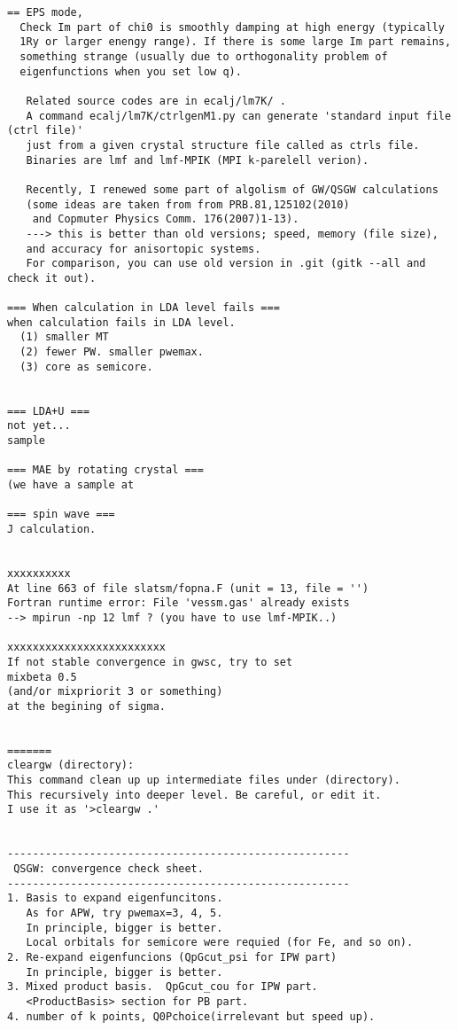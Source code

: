 \documentclass[a4paper,10pt,epsf,fleqn]{article}
\begin{document}
\begin{verbatim}
== EPS mode,
  Check Im part of chi0 is smoothly damping at high energy (typically
  1Ry or larger enengy range). If there is some large Im part remains,
  something strange (usually due to orthogonality problem of
  eigenfunctions when you set low q).

   Related source codes are in ecalj/lm7K/ .
   A command ecalj/lm7K/ctrlgenM1.py can generate 'standard input file (ctrl file)' 
   just from a given crystal structure file called as ctrls file. 
   Binaries are lmf and lmf-MPIK (MPI k-parelell verion).

   Recently, I renewed some part of algolism of GW/QSGW calculations
   (some ideas are taken from from PRB.81,125102(2010) 
    and Copmuter Physics Comm. 176(2007)1-13).
   ---> this is better than old versions; speed, memory (file size),
   and accuracy for anisortopic systems.
   For comparison, you can use old version in .git (gitk --all and check it out).

=== When calculation in LDA level fails ===
when calculation fails in LDA level.
  (1) smaller MT
  (2) fewer PW. smaller pwemax.
  (3) core as semicore.


=== LDA+U ===
not yet...
sample

=== MAE by rotating crystal ===
(we have a sample at

=== spin wave ===
J calculation.


xxxxxxxxxx
At line 663 of file slatsm/fopna.F (unit = 13, file = '')
Fortran runtime error: File 'vessm.gas' already exists
--> mpirun -np 12 lmf ? (you have to use lmf-MPIK..)

xxxxxxxxxxxxxxxxxxxxxxxxx
If not stable convergence in gwsc, try to set
mixbeta 0.5
(and/or mixpriorit 3 or something)
at the begining of sigma.


=======
cleargw (directory):
This command clean up up intermediate files under (directory).
This recursively into deeper level. Be careful, or edit it.
I use it as '>cleargw .'


------------------------------------------------------
 QSGW: convergence check sheet.
------------------------------------------------------
1. Basis to expand eigenfuncitons. 
   As for APW, try pwemax=3, 4, 5.
   In principle, bigger is better.
   Local orbitals for semicore were requied (for Fe, and so on).
2. Re-expand eigenfuncions (QpGcut_psi for IPW part)
   In principle, bigger is better. 
3. Mixed product basis.  QpGcut_cou for IPW part. 
   <ProductBasis> section for PB part.
4. number of k points, Q0Pchoice(irrelevant but speed up).


\end{verbatim}
\end{document}
